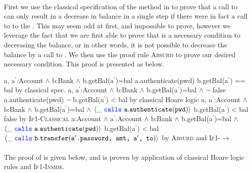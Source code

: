 \paragraph{\emph{\textbf{}}}First we use the classical specification of the  method in  to prove that a call to  can only result in 
a decrease in balance in a single step if there were in fact a call to  to the . This may seem 
odd at first, and impossible to prove, however we leverage the fact that we are first able to prove that 
is a necessary condition to decreasing the balance, or in other words, it is not possible to decrease the balance by a
call to . We then use the proof rule \textsc{Absurd} to prove our desired necessary condition.
This proof is presented as  below.
\\
\noindent
{
	\begin{proofexample}
			{\proofstepwithrule
				{\hoareEx
						{a, a$^\prime$:Account $\wedge$ b:Bank $\wedge$ b.getBal(a$^\prime$)=bal}
						{a.authenticate(pwd)}
						{b.getBal(a$^\prime$) == bal}
						}
					{by classical spec.}
			}
			{\proofstepwithrule
				{\hoareEx
						{a, a$^\prime$:Account $\wedge$ b:Bank $\wedge$ b.getBal(a$^\prime$)=bal $\wedge$ $\neg$ false}
						{a.authenticate(pwd)}
						{$\neg$ b.getBal(a$^\prime$) < bal}
						}
					{by classical Hoare logic}
			}
			{\proofstepwithrule
				{\onlyIfSingleExAlt
						{a, a$^\prime$:Account $\wedge$ b:Bank $\wedge$ b.getBal(a$^\prime$)=bal $\wedge$ $\langle \_\ {\color{blue}\texttt{calls}}\ {\texttt{a}}.{\texttt{authenticate}}({\texttt{pwd}}) \rangle$}
						{b.getBal(a$^\prime$) < bal}
						{false}
						}
					{by \textsc{If1-Classical}}
			}
			{\proofstepwithrule
				{\onlyIfSingleEx
						{a:Account $\wedge$ a$^\prime$:Account $\wedge$ b:Bank $\wedge$ b.getBal(a$^\prime$)=bal $\wedge$ $\langle \_\ {\color{blue}\texttt{calls}}\ {\texttt{a}}.{\texttt{authenticate}}({\texttt{pwd}}) \rangle$}
						{b.getBal(a$^\prime$) < bal}
						{$\langle \_\ {\color{blue}\texttt{calls}}\ {\texttt{b}}.{\texttt{transfer}}({\texttt{a$^\prime$.password, amt, a$^\prime$, to}}) \rangle$}
						}
					{by \textsc{Absurd} and \textsc{If1-}$\longrightarrow$}
			}
		\endproofsteps
	\end{proofexample}
}

\paragraph{\emph{\textbf{}}} The proof of  is given below, and is proven by application of classical Hoare logic rules and \textsc{If1-Inside}.

